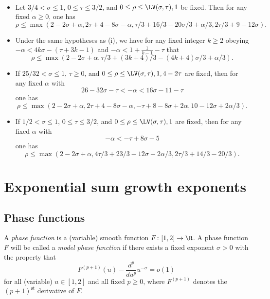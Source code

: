     \begin{lemma}\label{kerr-thm}\
        \begin{itemize}
        \item[(i)]\cite[Theorem 2]{kerr} Let $3/4 < \sigma \leq 1$, $0 \leq \tau \leq 3/2$, and $0 \leq \rho \leq \LV(\sigma,\tau), 1$ be fixed.  Then for any fixed $\alpha \geq 0$, one has
        $$ \rho \leq \max( 2-2\sigma+\alpha, 2\tau+4-8\sigma-\alpha, \tau/3+16/3 -20\sigma/3 + \alpha/3, 2\tau/3+9-12\sigma).$$
        \item[(ii)] \cite[Theorem 3]{kerr} Under the same hypotheses as (i), we have for any fixed integer $k \geq 2$ obeying
        $-\alpha < 4k\sigma -(\tau+3k-1)$ and $-\alpha < 1 + \frac{1}{k-1} - \tau$ that
        $$ \rho \leq \max(2-2\sigma+\alpha, \tau/3+(3k+4)/3-(4k+4)\sigma/3 + \alpha/3).$$
        \item[(iii)] \cite[Theorem 4]{kerr} If $25/32 < \sigma \leq 1$, $\tau \geq 0$, and $0 \leq \rho \leq \LV(\sigma,\tau), 1, 4-2\tau$ are fixed, then for any fixed $\alpha$ with
        $$ 26 - 32 \sigma - \tau < - \alpha < 16\sigma -11-\tau$$
        one has
        $$ \rho \leq \max( 2-2\sigma+\alpha, 2\tau+4-8\sigma-\alpha, -\tau+8-8\sigma+2\alpha, 10-12\sigma+2\alpha/3).$$
        \item[(iv)] \cite[Theorem 5]{kerr} If $1/2 < \sigma \leq 1$, $0 \leq \tau \leq 3/2$, and $0 \leq \rho \leq \LV(\sigma,\tau), 1$ are fixed, then for any fixed $\alpha$ with
        $$ - \alpha < -\tau + 8\sigma - 5$$
        one has
        $$ \rho \leq \max(2-2\sigma+\alpha, 4\tau/3 +23/3 - 12\sigma - 2\alpha/3, 2\tau/3 + 14/3 - 20/3 ).$$
    \end{itemize}
    \end{lemma}


\chapter{Exponential sum growth exponents}\label{beta-chapter}

\section{Phase functions}

\begin{definition}[Phase function]\label{phase-def}
\leanok
A \emph{phase function} is a (variable) smooth function $F \colon [1,2] \to \R$.  A phase function $F$ will be called a \emph{model phase function} if there exists a fixed exponent $\sigma > 0$ with the property that
\begin{equation}\label{fpu}
F^{(p+1)}(u) - \frac{d^p}{du^p} u^{-\sigma} = o(1)
\end{equation}
for all (variable) $u \in [1,2]$ and all fixed $p \geq 0$, where $F^{(p+1)}$ denotes the $(p+1)^{\mathrm{st}}$ derivative of $F$.
\end{definition}

